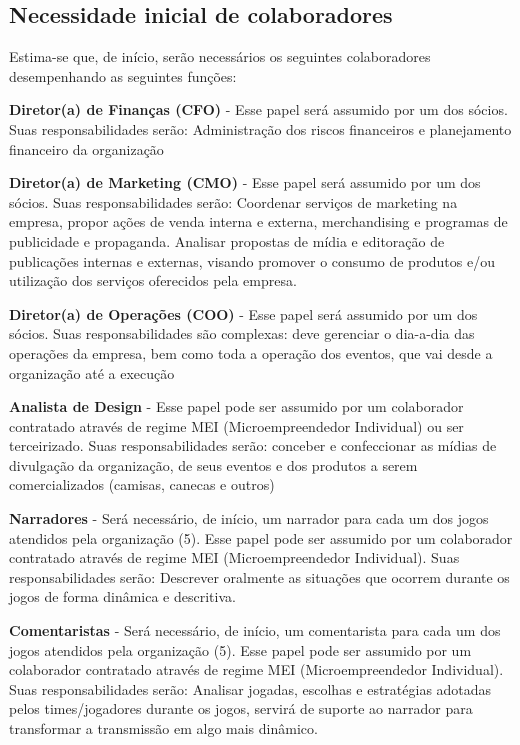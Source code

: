 \documentclass[a4paper, 12pt]{paper}
\begin{document}
\subsection{Necessidade inicial de colaboradores}
Estima-se que, de início, serão necessários os seguintes colaboradores desempenhando as seguintes funções: 

\textbf{Diretor(a) de Finanças (CFO)} - Esse papel será assumido por um dos sócios. Suas responsabilidades serão: Administração dos riscos financeiros e planejamento financeiro da organização

\textbf{Diretor(a) de Marketing (CMO)} -  Esse papel será assumido por um dos sócios. Suas responsabilidades serão: Coordenar serviços de marketing na empresa,  propor ações de venda interna e externa, merchandising e programas de publicidade e propaganda. Analisar propostas de mídia e editoração de publicações internas e externas, visando promover o consumo de produtos e/ou utilização dos serviços oferecidos pela empresa.

\textbf{Diretor(a) de Operações (COO)} - Esse papel será assumido por um dos sócios. Suas responsabilidades são complexas: deve gerenciar o dia-a-dia das operações da empresa, bem como toda a operação dos eventos, que vai desde a organização até a execução

\textbf{Analista de Design} - Esse papel pode ser assumido por um colaborador contratado através de regime MEI (Microempreendedor Individual) ou ser terceirizado. Suas responsabilidades serão: conceber e confeccionar as mídias de divulgação da organização, de seus eventos e dos produtos a serem comercializados (camisas, canecas e outros)

\textbf{Narradores} - Será necessário, de início, um narrador para cada um dos jogos atendidos pela organização (5). Esse papel pode ser assumido por um colaborador contratado através de regime MEI (Microempreendedor Individual). Suas responsabilidades serão: Descrever oralmente as situações que ocorrem durante os jogos de forma dinâmica e descritiva.

\textbf{Comentaristas} - Será necessário, de início, um comentarista para cada um dos jogos atendidos pela organização (5). Esse papel pode ser assumido por um colaborador contratado através de regime MEI (Microempreendedor Individual). Suas responsabilidades serão: Analisar jogadas, escolhas e estratégias adotadas pelos times/jogadores durante os jogos, servirá de suporte ao narrador para transformar a transmissão em algo mais dinâmico.
\end{document}

